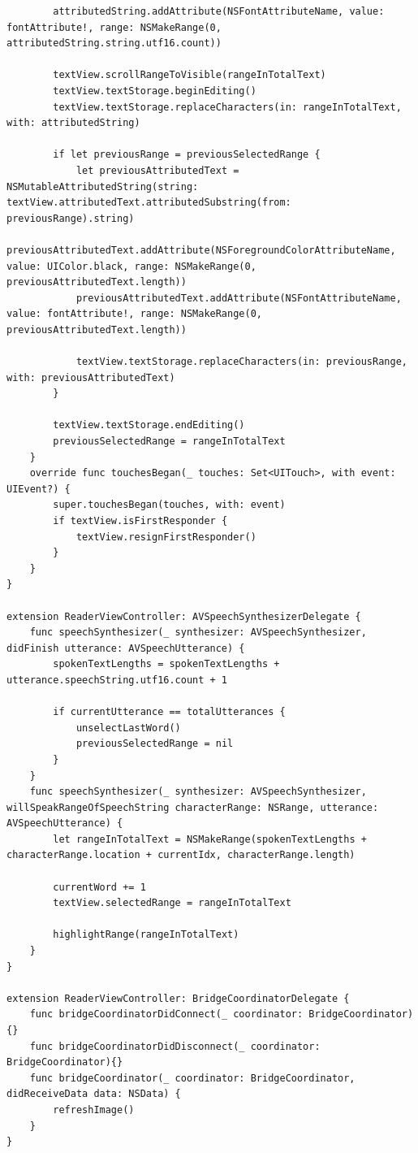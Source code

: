 \begin{lstlisting}
        attributedString.addAttribute(NSFontAttributeName, value: fontAttribute!, range: NSMakeRange(0, attributedString.string.utf16.count))
        
        textView.scrollRangeToVisible(rangeInTotalText)
        textView.textStorage.beginEditing()
        textView.textStorage.replaceCharacters(in: rangeInTotalText, with: attributedString)
        
        if let previousRange = previousSelectedRange {
            let previousAttributedText = NSMutableAttributedString(string: textView.attributedText.attributedSubstring(from: previousRange).string)
            previousAttributedText.addAttribute(NSForegroundColorAttributeName, value: UIColor.black, range: NSMakeRange(0, previousAttributedText.length))
            previousAttributedText.addAttribute(NSFontAttributeName, value: fontAttribute!, range: NSMakeRange(0, previousAttributedText.length))
            
            textView.textStorage.replaceCharacters(in: previousRange, with: previousAttributedText)
        }
        
        textView.textStorage.endEditing()
        previousSelectedRange = rangeInTotalText
    }
    override func touchesBegan(_ touches: Set<UITouch>, with event: UIEvent?) {
        super.touchesBegan(touches, with: event)
        if textView.isFirstResponder {
            textView.resignFirstResponder()
        }
    }
}

extension ReaderViewController: AVSpeechSynthesizerDelegate {
    func speechSynthesizer(_ synthesizer: AVSpeechSynthesizer, didFinish utterance: AVSpeechUtterance) {
        spokenTextLengths = spokenTextLengths + utterance.speechString.utf16.count + 1
        
        if currentUtterance == totalUtterances {
            unselectLastWord()
            previousSelectedRange = nil
        }
    }
    func speechSynthesizer(_ synthesizer: AVSpeechSynthesizer, willSpeakRangeOfSpeechString characterRange: NSRange, utterance: AVSpeechUtterance) {
        let rangeInTotalText = NSMakeRange(spokenTextLengths + characterRange.location + currentIdx, characterRange.length)
        
        currentWord += 1
        textView.selectedRange = rangeInTotalText
        
        highlightRange(rangeInTotalText)
    }
}

extension ReaderViewController: BridgeCoordinatorDelegate {
    func bridgeCoordinatorDidConnect(_ coordinator: BridgeCoordinator){}
    func bridgeCoordinatorDidDisconnect(_ coordinator: BridgeCoordinator){}
    func bridgeCoordinator(_ coordinator: BridgeCoordinator, didReceiveData data: NSData) {
        refreshImage()
    }
}


\end{lstlisting}
